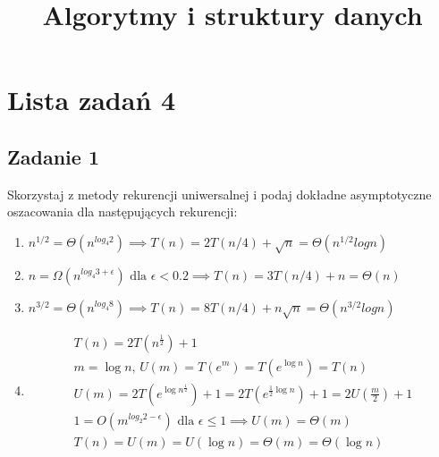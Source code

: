 \documentclass{article}
\begin{document}
\title{Algorytmy i struktury danych}
\author{}
\date{}
\maketitle

\section*{Lista zadań 4}

\subsection*{Zadanie 1}
Skorzystaj z metody rekurencji uniwersalnej i podaj dokładne asymptotyczne
oszacowania dla następujących rekurencji:
\begin{enumerate}[label=(\alph*)]
    \item $n^{1/2} = \Theta(n^{log_4 2}) \implies T(n) = 2T(n/4) + \sqrt{n} = \Theta(n^{1/2}logn)$
    \item $n = \Omega(n^{log_4 3+\epsilon}) \text{ dla } \epsilon < 0.2 \implies T(n) = 3T(n/4) + n = \Theta(n)$
    \item $n^{3/2} = \Theta(n^{log_4 8}) \implies T(n) = 8T(n/4) + n\sqrt{n} = \Theta(n^{3/2}logn)$
    \item \begin{gather*}
              T(n) = 2T\left(n^\frac{1}{2}\right) + 1 \\
              m = \log n \text{, } U(m) = T\left(e^m\right) = T\left(e^{\log n}\right) = T(n) \\
              U(m) = 2T\left(e^{\log n^\frac{1}{2}}\right) + 1 = 2T\left(e^{\frac{1}{2}\log n}\right) + 1 = 2U\left(\frac{m}{2}\right) + 1 \\
              1 = O\left(m^{log_2 2-\epsilon}\right) \text{ dla } \epsilon \leq 1 \implies U(m) = \Theta(m) \\
              T(n) = U(m) = U(\log n) = \Theta(m) = \Theta(\log n)
          \end{gather*}
\end{enumerate}
\end{document}
